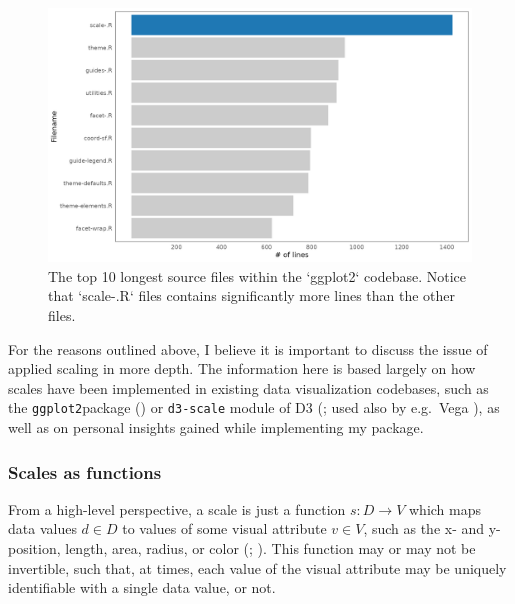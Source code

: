\documentclass[
]{book}
\theoremstyle{definition}
\theoremstyle{definition}
\theoremstyle{definition}
\theoremstyle{definition}
\theoremstyle{remark}
\begin{document}
\begin{figure}

{\centering \includegraphics[width=1\linewidth,height=1\textheight]{./figures/ggplot2-linecounts} 

}

\caption{The top 10 longest source files within the `ggplot2` codebase. Notice that `scale-.R` files contains significantly more lines than the other files.}\label{fig:ggplot2-linecounts}
\end{figure}

For the reasons outlined above, I believe it is important to discuss the issue of applied scaling in more depth. The information here is based largely on how scales have been implemented in existing data visualization codebases, such as the \texttt{ggplot2}package () or \texttt{d3-scale} module of D3 (; used also by e.g.~Vega ), as well as on personal insights gained while implementing my package.

\subsubsection{Scales as functions}\label{scales-as-functions}

From a high-level perspective, a scale is just a function \(s: D \to V\) which maps data values \(d \in D\) to values of some visual attribute \(v \in V\), such as the x- and y-position, length, area, radius, or color (; ). This function may or may not be invertible, such that, at times, each value of the visual attribute may be uniquely identifiable with a single data value, or not.
\end{document}
